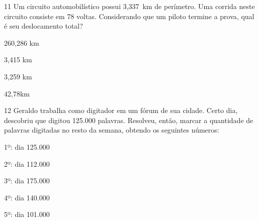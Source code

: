 






\pagebreak

\num{11} Um circuito automobilístico possui 3,337~km de perímetro. Uma
corrida neste circuito consiste em 78 voltas. Considerando que um piloto
termine a prova, qual é seu deslocamento total?

\begin{multicols}{2}
\begin{escolha}
\item 260,286 km
\item 3,415 km
\item 3,259 km
\item 42,78km
\end{escolha}
\end{multicols}







\num{12} Geraldo trabalha como digitador em um fórum de sua cidade. Certo
dia, descobriu que digitou 125.000 palavras. Resolveu, então, marcar a
quantidade de palavras digitadas no resto da semana, obtendo os
seguintes números:

1º: dia 125.000

2º: dia 112.000

3º: dia 175.000

4º: dia 140.000

5º: dia 101.000


